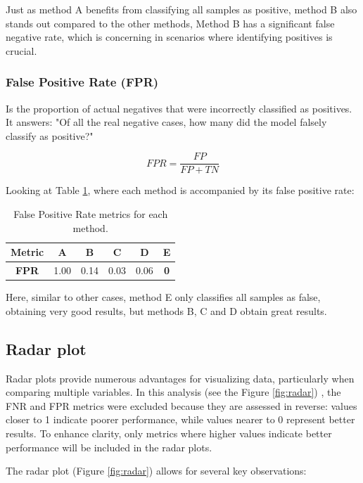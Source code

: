 \documentclass{llncs}
\begin{document}
Just as method A benefits from classifying all samples as positive, method B also stands out compared to the other methods, Method B has a significant false negative rate, which is concerning in scenarios where identifying positives is crucial.

\subsubsection{False Positive Rate (FPR)}
Is the proportion of actual negatives that were incorrectly classified as positives. It answers: "Of all the real negative cases, how many did the model falsely classify as positive?"

\[
FPR = \frac{FP}{FP + TN}
\]

Looking at Table \ref{tab:fpr}, where each method is accompanied by its false positive rate:
\begin{table}[h]
	\centering
	\begin{tabular}{|c|c|c|c|c|c|} 
		\hline 
		\textbf{Metric} & \textbf{A} & \textbf{B} & \textbf{C} & \textbf{D} & \textbf{E} \\ 
		\hline 
		\textbf{FPR} & 1.00 & 0.14 & 0.03 & 0.06 & \textbf{0} \\ 
		\hline 
	\end{tabular} 
	\caption{False Positive Rate metrics for each method.} 
	\label{tab:fpr} 
\end{table}
\vspace{-20pt}

Here, similar to other cases, method E only classifies all samples as false, obtaining very good results, but methods B, C and D obtain great results.

\subsection{Radar plot}

Radar plots provide numerous advantages for visualizing data, particularly when comparing multiple variables. In this analysis  (see the Figure \ref{fig:radar}) , the FNR and FPR metrics were excluded because they are assessed in reverse: values closer to 1 indicate poorer performance, while values nearer to 0 represent better results. To enhance clarity, only metrics where higher values indicate better performance will be included in the radar plots.

The radar plot (Figure \ref{fig:radar}) allows for several key observations:
\end{document}
